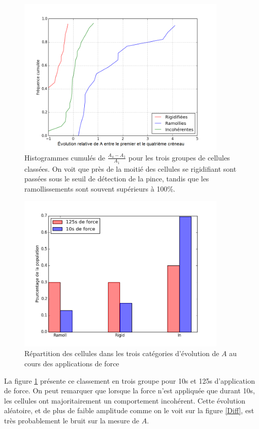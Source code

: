 \begin{figure}
\includegraphics[width=10cm]{Figures/Evolution_J4-J0_sur_J0.png} 
\caption{Histogrammes cumulés de $\frac{A_4-A_1}{A_1}$ pour les trois groupes de cellules classées. On voit que près de la moitié des cellules se rigidifiant sont passées sous le seuil de détection de la pince, tandis que les ramollissements sont souvent supérieurs à 100\%.  }
\end{figure}

\begin{figure}
\includegraphics[width=10cm]{Figures/FRI_temoin_vs_C4.png} 
\caption{Répartition des cellules dans les trois catégories d'évolution de $A$ au cours des applications de force \label{FRI_temoin}}
\end{figure}

La figure \ref{FRI_temoin} présente ce classement en trois groupe pour 10s et 125s d’application de force. On peut remarquer que lorsque la force n'est appliquée que durant 10s, les cellules ont majoritairement un comportement incohérent.
Cette évolution aléatoire, et de plus de faible amplitude comme on le voit sur la figure \ref{Diff}, est très probablement le bruit sur la mesure de $A$. 

